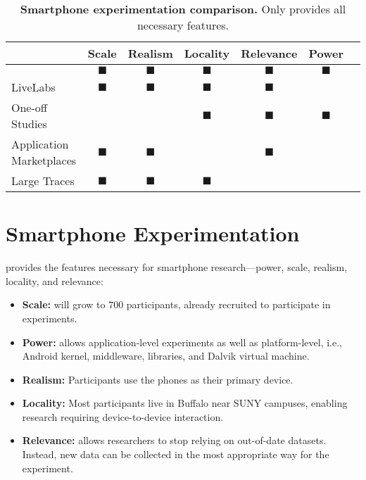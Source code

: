 \begin{table*}[t]
\begin{tabularx}{\textwidth}{Xcccccc}
& {\normalsize{\textbf{Scale}}} &
{\normalsize{\textbf{Realism}}} &
{\normalsize{\textbf{Locality}}} &
{\normalsize{\textbf{Relevance}}} &
{\normalsize{\textbf{Power}}} \\
\toprule

{\large \PhoneLab{}}
& $\blacksquare$ & $\blacksquare$ & $\blacksquare$ & $\blacksquare$ & $\blacksquare$ \\
\toprule

LiveLabs &
$\blacksquare$ & $\blacksquare$ & $\blacksquare$ & $\blacksquare$ & & \\
\midrule

One-off Studies &
& & $\blacksquare$ & $\blacksquare$ & $\blacksquare$ \\
\midrule

Application Marketplaces &
$\blacksquare$ & $\blacksquare$ & & $\blacksquare$ & \\
\midrule

Large Traces &
$\blacksquare$ & $\blacksquare$ & $\blacksquare$ & & \\
\bottomrule

\end{tabularx}
\caption{\textbf{Smartphone experimentation comparison.} Only \PhoneLab{}
provides all necessary features.}
\label{tab:comparison}
\end{table*}

\section{Smartphone Experimentation}
\label{sec-comparison}

\PhoneLab{} provides the features necessary for smartphone research---power,
scale, realism, locality, and relevance:

\begin{itemize}[nosep,leftmargin=*]
\vspace*{0.08in}
\item {\bf Scale:} \PhoneLab{} will grow to 700 participants, already
recruited to participate in experiments.
\item {\bf Power:} \PhoneLab{} allows application-level experiments as well
as platform-level, i.e., Android kernel, middleware, libraries, and Dalvik
virtual machine.
\item {\bf Realism:} Participants use the phones as their primary device.
\item {\bf Locality:} Most participants live in Buffalo near SUNY campuses,
enabling research requiring device-to-device interaction.
\item {\bf Relevance:} \PhoneLab{} allows researchers to stop relying on
out-of-date datasets. Instead, new data can be collected in the most
appropriate way for the experiment.
\vspace*{0.08in}
\end{itemize}

